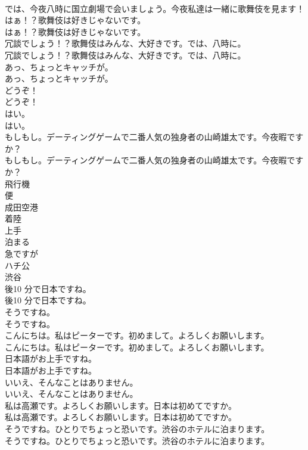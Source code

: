 \documentclass[8pt]{extreport}
\begin{document}
\begin{CJK}{UTF8}{min}
\\	では、今夜八時に国立劇場で会いましょう。今夜私達は一緒に歌舞伎を見ます！ 
\\	はぁ！？歌舞伎は好きじゃないです。	
\\	はぁ！？歌舞伎は好きじゃないです。 
\\	冗談でしょう！？歌舞伎はみんな、大好きです。では、八時に。	
\\	冗談でしょう！？歌舞伎はみんな、大好きです。では、八時に。 
\\	あっ、ちょっとキャッチが。	
\\	あっ、ちょっとキャッチが。 
\\	どうぞ！	
\\	どうぞ！ 
\\	はい。	
\\	はい。 
\\	もしもし。デーティングゲームで二番人気の独身者の山崎雄太です。今夜暇ですか？	
\\	もしもし。デーティングゲームで二番人気の独身者の山崎雄太です。今夜暇ですか？ 
\\	飛行機
\\	便
\\	成田空港
\\	着陸
\\	上手
\\	泊まる
\\	急ですが
\\	ハチ公
\\	渋谷
\\	後10 分で日本ですね。	
\\	後10 分で日本ですね。 
\\	そうですね。	
\\	そうですね。 
\\	こんにちは。私はピーターです。初めまして。よろしくお願いします。	
\\	こんにちは。私はピーターです。初めまして。よろしくお願いします。 
\\	日本語がお上手ですね。	
\\	日本語がお上手ですね。 
\\	いいえ、そんなことはありません。	
\\	いいえ、そんなことはありません。 
\\	私は高瀬です。よろしくお願いします。日本は初めてですか。	
\\	私は高瀬です。よろしくお願いします。日本は初めてですか。 
\\	そうですね。ひとりでちょっと恐いです。渋谷のホテルに泊まります。	
\\	そうですね。ひとりでちょっと恐いです。渋谷のホテルに泊まります。 

\end{CJK}
\end{document}
